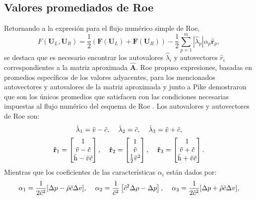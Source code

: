 \subsection{Valores promediados de Roe}
Retornando a la expresión para el flujo numérico simple de Roe,
\begin{equation}
	F(\mathbf{U}_L, \mathbf{U}_R) = \frac{1}{2}\left(\mathbf{F}(\mathbf{U}_L) +\mathbf{F}(\mathbf{U}_R)\right) - 
	\frac{1}{2}\sum_{p=1}^{m}|\hat{\lambda}_{p}|\alpha_{p}\mathbf{\hat{r}}_{p},
	\label{eq:roe-flux-2}
\end{equation}
se destaca que es necesario encontrar los autovalores $\hat{\lambda}_i$ y autovectores $\hat{r}_i$ correspondientes a la matriz aproximada $\mathbf{\hat{A}}$. Roe \cite{roe81} propuso expresiones, basadas en promedios específicos de los valores adyacentes, para los mencionados autovectores y autovalores de la matriz aproximada y junto a Pike demostraron que son los únicos promedios que satisfacen con las condiciones necesarias impuestas al flujo numérico del esquema de Roe \cite{roe86}. Los autovalores y autovectores de Roe son:
\begin{equation}
	\hat{\lambda}_1 = \tilde{v}-\tilde{c}, \hspace{4mm}
	\hat{\lambda}_2 = \tilde{c}, \hspace{4mm}
	\hat{\lambda}_3 = \tilde{v}+\tilde{c},
\end{equation}
\begin{equation}
	\mathbf{\hat{r}}_1 = 
	\begin{bmatrix}
		1 \\
		\tilde{v}-\tilde{c} \\
		\tilde{\mathrm{h}}-\tilde{v}\tilde{c}
	\end{bmatrix},\hspace{4mm}
	\mathbf{\hat{r}}_2 = 
	\begin{bmatrix}
		1 \\
		\tilde{v} \\
		\frac{1}{2}\tilde{v}^{2}
	\end{bmatrix},\hspace{4mm}
	\mathbf{\hat{r}}_3 = 
	\begin{bmatrix}
		1 \\
		\tilde{v}+\tilde{c} \\
		\tilde{\mathrm{h}}+\tilde{v}\tilde{c}
	\end{bmatrix}.
\end{equation}
 Mientras que los coeficientes de las características $\alpha_{i}$ están dados por:
 \begin{equation}
 	\alpha_1 = \frac{1}{2\tilde{c}^{2}}[\Delta p - \tilde{\rho}\tilde{c}\Delta v], \hspace{4mm}
 	\alpha_2 = \frac{1}{\tilde{c}^{2}}\left[\tilde{c}^{2}\Delta\rho - \Delta p\right], \hspace{4mm}
 	\alpha_3 = \frac{1}{2\tilde{c}^{2}}[\Delta p + \tilde{\rho}\tilde{c}\Delta v],
 \end{equation}
